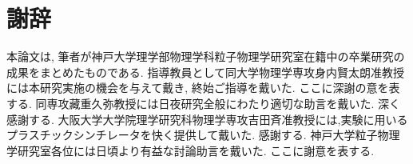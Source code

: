 \chapter*{謝辞}\label{thanks}


本論文は, 筆者が神戸大学理学部物理学科粒子物理学研究室在籍中の卒業研究の成果をまとめたものである.
指導教員として同大学物理学専攻身内賢太朗准教授には本研究実施の機会を与えて戴き, 終始ご指導を戴いた.
ここに深謝の意を表する.
同専攻藏重久弥教授には日夜研究全般にわたり適切な助言を戴いた.
深く感謝する.
大阪大学大学院理学研究科物理学専攻吉田斉准教授には,実験に用いるプラスチックシンチレータを快く提供して戴いた.
感謝する.
神戸大学粒子物理学研究室各位には日頃より有益な討論助言を戴いた.
ここに謝意を表する.
